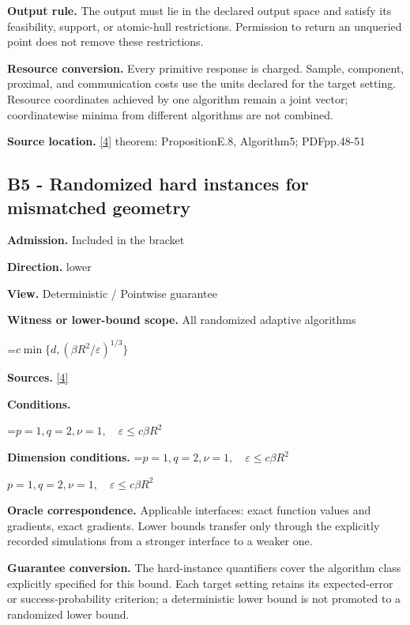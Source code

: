 \documentclass[10pt,a4paper]{article}
\newcommand{\AtlasMath}[1]{\par\begingroup\centering\setbox0=\hbox{$\displaystyle #1$}\ifdim\wd0>1.4\linewidth\typeout{ATLAS WIDE FORMULA: \the\wd0}\fi\ifdim\wd0>\linewidth\resizebox{\linewidth}{!}{\box0}\else\box0\fi\par\endgroup}
\newcommand{\AtlasInlineMath}[1]{\begingroup\setbox0=\hbox{$#1$}\ifdim\wd0>.4\linewidth\endgroup\AtlasMath{#1}\else\endgroup$#1$\fi}
\begin{document}
\textbf{Output rule.} The output must lie in the declared output space and satisfy its feasibility, support, or atomic-hull restrictions. Permission to return an unqueried point does not remove these restrictions.



\textbf{Resource conversion.} Every primitive response is charged. Sample, component, proximal, and communication costs use the units declared for the target setting. Resource coordinates achieved by one algorithm remain a joint vector; coordinatewise minima from different algorithms are not combined.



\textbf{Source location.} \href{https://arxiv.org/pdf/2609.32910}{[4]} theorem: PropositionE.8, Algorithm5; PDFpp.48-51



\subsection{B5 - Randomized hard instances for mismatched geometry}


\textbf{Admission.} Included in the bracket



\textbf{Direction.} lower



\textbf{View.} Deterministic / Pointwise guarantee



\textbf{Witness or lower-bound scope.} All randomized adaptive algorithms



\AtlasMath{c\min\{d,(\beta R^2/\varepsilon)^{1/3}\}}


\textbf{Sources.} \href{https://arxiv.org/pdf/2609.32910}{[4]}



\textbf{Conditions.}
\AtlasMath{p=1,q=2,\nu=1,\quad\varepsilon\le c\beta R^2}




\textbf{Dimension conditions.} \AtlasInlineMath{p=1,q=2,\nu=1,\quad\varepsilon\le c\beta R^2}



\textbf{Oracle correspondence.} Applicable interfaces: exact function values and gradients, exact gradients. Lower bounds transfer only through the explicitly recorded simulations from a stronger interface to a weaker one.



\textbf{Guarantee conversion.} The hard-instance quantifiers cover the algorithm class explicitly specified for this bound. Each target setting retains its expected-error or success-probability criterion; a deterministic lower bound is not promoted to a randomized lower bound.
\end{document}
